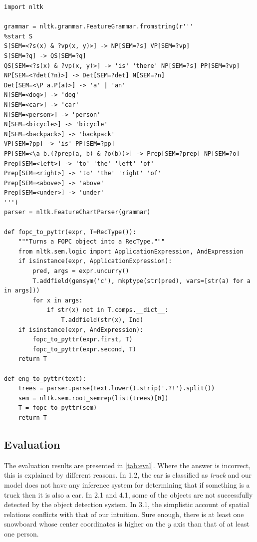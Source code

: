\begin{lstlisting}[label=lst:grammar, caption=Basic parsing of natural language into PyTTR object]
import nltk

grammar = nltk.grammar.FeatureGrammar.fromstring(r'''
%start S
S[SEM=<?s(x) & ?vp(x, y)>] -> NP[SEM=?s] VP[SEM=?vp]
S[SEM=?q] -> QS[SEM=?q]
QS[SEM=<?s(x) & ?vp(x, y)>] -> 'is' 'there' NP[SEM=?s] PP[SEM=?vp]
NP[SEM=<?det(?n)>] -> Det[SEM=?det] N[SEM=?n]
Det[SEM=<\P a.P(a)>] -> 'a' | 'an'
N[SEM=<dog>] -> 'dog'
N[SEM=<car>] -> 'car'
N[SEM=<person>] -> 'person'
N[SEM=<bicycle>] -> 'bicycle'
N[SEM=<backpack>] -> 'backpack'
VP[SEM=?pp] -> 'is' PP[SEM=?pp]
PP[SEM=<\a b.(?prep(a, b) & ?o(b))>] -> Prep[SEM=?prep] NP[SEM=?o]
Prep[SEM=<left>] -> 'to' 'the' 'left' 'of'
Prep[SEM=<right>] -> 'to' 'the' 'right' 'of'
Prep[SEM=<above>] -> 'above'
Prep[SEM=<under>] -> 'under'
''')
parser = nltk.FeatureChartParser(grammar)

def fopc_to_pyttr(expr, T=RecType()):
    """Turns a FOPC object into a RecType."""
    from nltk.sem.logic import ApplicationExpression, AndExpression
    if isinstance(expr, ApplicationExpression):
        pred, args = expr.uncurry()
        T.addfield(gensym('c'), mkptype(str(pred), vars=[str(a) for a in args]))
        for x in args:
            if str(x) not in T.comps.__dict__:
                T.addfield(str(x), Ind)
    if isinstance(expr, AndExpression):
        fopc_to_pyttr(expr.first, T)
        fopc_to_pyttr(expr.second, T)
    return T

def eng_to_pyttr(text):
    trees = parser.parse(text.lower().strip('.?!').split())
    sem = nltk.sem.root_semrep(list(trees)[0])
    T = fopc_to_pyttr(sem)
    return T
\end{lstlisting}



\subsection{Evaluation}

The evaluation results are presented in \autoref{tab:eval}.
Where the answer is incorrect, this is explained by different reasons.
In 1.2, the car is classified as \textit{truck} and our model does not have any inference system for determining that if something is a truck then it is also a car.
In 2.1 and 4.1, some of the objects are not successfully detected by the object detection system.
In 3.1, the simplistic account of spatial relations conflicts with that of our intuition.
Sure enough, there is at least one snowboard whose center coordinates is higher on the $y$ axis than that of at least one person.


